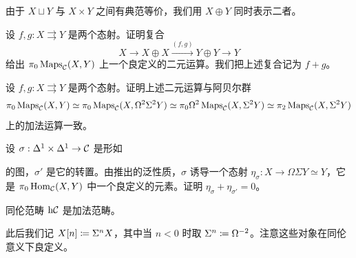 \nitem\label{L15-2.3} 由于 $X\sqcup Y$ 与 $X\times Y$ 之间有典范等价，我们用 $X\oplus Y$ 同时表示二者。

\begin{exercise}\label{L15-2.4}
设 $f,g:X\rightrightarrows Y$ 是两个态射。证明复合
\[
X\to X\oplus X\xrightarrow{(f,g)}Y\oplus Y\to Y
\]
给出 $\pi_{0}\operatorname{Maps}_{\mathcal{C}}(X,Y)$ 上一个良定义的二元运算。我们把上述复合记为 $f+g$。
\end{exercise}

\begin{exercise}\label{L15-2.5}
设 $f,g:X\rightrightarrows Y$ 是两个态射。证明上述二元运算与阿贝尔群
\[
\pi_{0}\operatorname{Maps}_{\mathcal{C}}(X,Y)\simeq\pi_{0}\operatorname{Maps}_{\mathcal{C}}(X,\Omega^{2}\Sigma^{2}Y)\simeq\pi_{0}\Omega^{2}\operatorname{Maps}_{\mathcal{C}}(X,\Sigma^{2}Y)\simeq\pi_{2}\operatorname{Maps}_{\mathcal{C}}(X,\Sigma^{2}Y)
\]
上的加法运算一致。
\end{exercise}

\begin{exercise}\label{L15-2.6}
设 $\sigma:\Delta^{1}\times\Delta^{1}\to\mathcal{C}$ 是形如
\begin{center}
\end{center}
的图，$\sigma'$ 是它的转置。由推出的泛性质，$\sigma$ 诱导一个态射 $\eta_{\sigma}:X\to\Omega\Sigma Y\simeq Y$，它是 $\pi_{0}\operatorname{Hom}_{\mathcal{C}}(X,Y)$ 中一个良定义的元素。证明 $\eta_{\sigma}+\eta_{\sigma'}=0$。
\end{exercise}

\begin{corollary}\label{L15-2.7}
同伦范畴 $\mathrm{h}\mathcal{C}$ 是加法范畴。
\end{corollary}

\nitem\label{L15-2.8} 此后我们记 $X[n]\coloneqq\Sigma^{n}X$，其中当 $n<0$ 时取 $\Sigma^{n}\coloneqq\Omega^{-2}$。注意这些对象在同伦意义下良定义。


